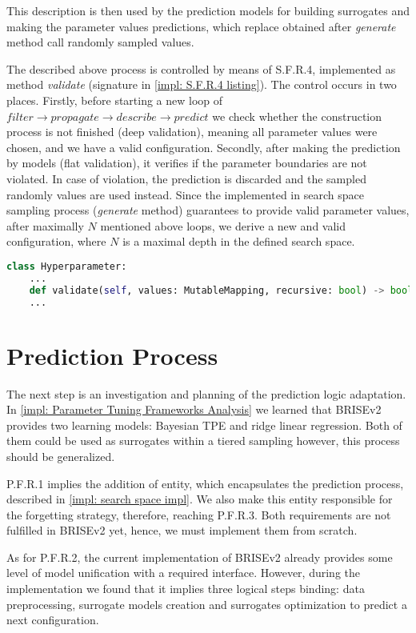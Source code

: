 This description is then used by the prediction models for building surrogates and making the parameter values predictions, which replace obtained after \emph{generate} method call randomly sampled values.

The described above process is controlled by means of S.F.R.4, implemented as method \emph{validate} (signature in \cref{impl: S.F.R.4 listing}). The control occurs in two places. Firstly, before starting a new loop of $filter \rightarrow propagate \rightarrow describe \rightarrow predict$ we check whether the construction process is not finished (deep validation), meaning all parameter values were chosen, and we have a valid configuration. Secondly, after making the prediction by models (flat validation), it verifies if the parameter boundaries are not violated. In case of violation, the prediction is discarded and the sampled randomly values are used instead. Since the implemented in search space sampling process (\emph{generate} method) guarantees to provide valid parameter values, after maximally $N$ mentioned above loops, we derive a new and valid configuration, where $N$ is a maximal depth in the defined search space.

\begin{lstlisting}[language=Python, caption=S.F.R.4 implementation., label=impl: S.F.R.4 listing]
class Hyperparameter:
	...
	def validate(self, values: MutableMapping, recursive: bool) -> bool
	...
\end{lstlisting}


\section{Prediction Process}\label{impl: prediction logic}
The next step is an investigation and planning of the prediction logic adaptation.
In \cref{impl: Parameter Tuning Frameworks Analysis} we learned that BRISEv2 provides two learning models: Bayesian TPE and ridge linear regression. Both of them could be used as surrogates within a tiered sampling however, this process should be generalized.

P.F.R.1 implies the addition of entity, which encapsulates the prediction process, described in \cref{impl: search space impl}. We also make this entity responsible for the forgetting strategy, therefore, reaching P.F.R.3. Both requirements are not fulfilled in BRISEv2 yet, hence, we must implement them from scratch.

As for P.F.R.2, the current implementation of BRISEv2 already provides some level of model unification with a required interface. However, during the implementation we found that it implies three logical steps binding: data preprocessing, surrogate models creation and surrogates optimization to predict a next configuration.

